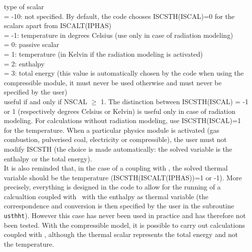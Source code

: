 {type of scalar\\
\hspace*{1.3cm}= -10: not specified. By default, the code chooses
ISCSTH(ISCAL)=0 for the scalars apart from ISCALT(IPHAS)\\
\hspace*{1.3cm}= -1: temperature in degrees Celsius (use only in case of
radiation modeling)\\
\hspace*{1.3cm}= 0: passive scalar\\
\hspace*{1.3cm}= 1: temperature (in Kelvin if the radiation modeling is
activated)\\
\hspace*{1.3cm}= 2: enthalpy\\
\hspace*{1.3cm}= 3: total energy (this value is automatically chosen by the code
when using the compressible module, it must never be used otherwise and must
never be specified by the user)\\
useful if and only if NSCAL $\geqslant$ 1. The distinction between
ISCSTH(ISCAL) = -1 or 1 (respectively degrees Celsius or Kelvin) is
useful only in case of radiation modeling. For calculations without
radiation modeling, use ISCSTH(ISCAL)=1 for the temperature. When a
particular physics module is activated (gas combustion, pulverised coal,
electricity or compressible), the user must not modify ISCSTH (the choice is made
automatically: the solved variable is the enthalpy or the total energy).\\
It is also reminded that, in the case of a coupling with
\syrthes, the solved thermal variable should be the temperature
(ISCSTH(ISCALT(IPHAS))=1 or -1).
More precisely, everything is designed in the code to allow for the
running of a calcualtion coupled with \syrthes\ with the enthalpy as thermal
variable (the correspondence and conversion is then specified by the user in
the subroutine \texttt{usthht}).
However this case has never been used in practice and has therefore not been
tested. With the compressible model, it is possible to carry out calculations
coupled with \syrthes, although the thermal scalar represents the total
energy and not the temperature.}

